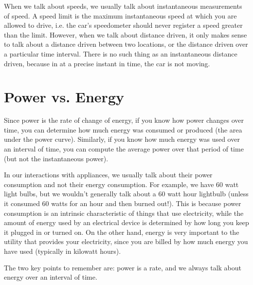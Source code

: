 When we talk about speeds, we usually talk about instantaneous measurements of speed. A speed limit is the maximum instantaneous speed at which you are allowed to drive, i.e. the car's speedometer should never register a speed greater than the limit. However, when we talk about distance driven, it only makes sense to talk about a distance driven between two locations, or the distance driven over a particular time interval. There is no such thing as an instantaneous distance driven, because in at a precise instant in time, the car is not moving.

\section{Power vs. Energy}

Since power is the rate of change of energy, if you know how power changes over time, you can determine how much energy was consumed or produced (the area under the power curve). Similarly, if you know how much energy was used over an interval of time, you can compute the average power over that period of time (but not the instantaneous power).

In our interactions with appliances, we usually talk about their power consumption and not their energy consumption. For example, we have 60 watt light bulbs, but we wouldn't generally talk about a 60 watt hour lightbulb (unless it consumed 60 watts for an hour and then burned out!). This is because power consumption is an intrinsic characteristic of things that use electricity, while the amount of energy used by an electrical device is determined by how long you keep it plugged in or turned on. On the other hand, energy is very important to the utility that provides your electricity, since you are billed by how much energy you have used (typically in kilowatt hours).

The two key points to remember are: power is a rate, and we always talk about energy over an interval of time.
